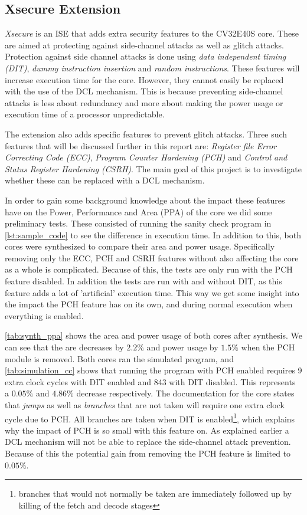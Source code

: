 \subsection{Xsecure Extension}
\label{sec:xsecure}

\textit{Xsecure} is an ISE that adds extra security features to the CV32E40S core. These are aimed at protecting against side-channel attacks as well as glitch attacks. Protection against side channel attacks is done using \textit{data independent timing (DIT)}, \textit{dummy instruction insertion} and \textit{random instructions}\cite{cv32e40s_manual}. These features will increase execution time for the core. However, they cannot easily be replaced with the use of the DCL mechanism. This is because preventing side-channel attacks is less about redundancy and more about making the power usage or execution time of a processor unpredictable. 

The extension also adds specific features to prevent glitch attacks. Three such features that will be discussed further in this report are: \textit{Register file Error Correcting Code (ECC)}, \textit{Program Counter Hardening (PCH)} and \textit{Control and Status Register Hardening (CSRH)}. The main goal of this project is to investigate whether these can be replaced with a DCL mechanism. 

In order to gain some background knowledge about the impact these features have on the Power, Performance and Area (PPA) of the core we did some preliminary tests. These consisted of running the sanity check program in \autoref{lst:sample_code} to see the difference in execution time. In addition to this, both cores were synthesized to compare their area and power usage. Specifically removing only the ECC, PCH and CSRH features without also affecting the core as a whole is complicated. Because of this, the tests are only run with the PCH feature disabled. In addition the tests are run with and without DIT, as this feature adds a lot of 'artificial' execution time. This way we get some insight into the impact the PCH feature has on its own, and during normal execution when everything is enabled. 

\autoref{tab:synth_ppa} shows the area and power usage of both cores after synthesis. We can see that the are decreases by $2.2\%$ and power usage by $1.5\%$ when the PCH module is removed. Both cores ran the simulated program, and \autoref{tab:simulation_cc} shows that running the program with PCH enabled requires 9 extra clock cycles with DIT enabled and 843 with DIT disabled. This represents a $0.05\%$ and $4.86\%$ decrease respectively. The documentation for the core states that \textit{jumps} as well as \textit{branches} that are not taken will require one extra clock cycle due to PCH. All branches are taken when DIT is enabled\footnote{branches that would not normally be taken are immediately followed up by killing of the fetch and decode stages}, which explains why the impact of PCH is so small with this feature on\cite{cv32e40s_manual}. As explained earlier a DCL mechanism will not be able to replace the side-channel attack prevention. Because of this the potential gain from removing the PCH feature is limited to $0.05\%$. 

